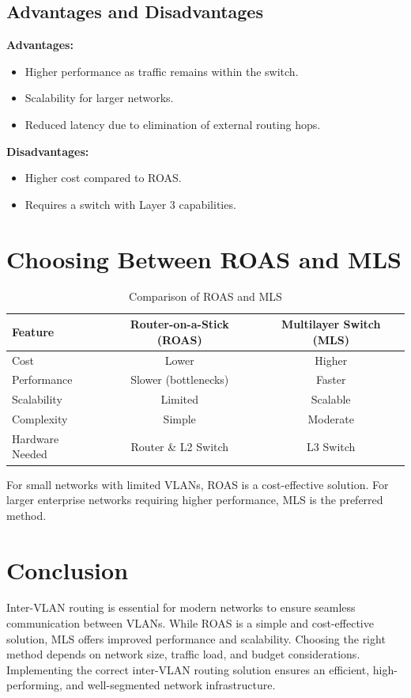 \documentclass[a4paper]{book}
\begin{document}
\subsection{Advantages and Disadvantages}
\textbf{Advantages:}
\begin{itemize}
    \item Higher performance as traffic remains within the switch.
    \item Scalability for larger networks.
    \item Reduced latency due to elimination of external routing hops.
\end{itemize}

\textbf{Disadvantages:}
\begin{itemize}
    \item Higher cost compared to ROAS.
    \item Requires a switch with Layer 3 capabilities.
\end{itemize}

\section{Choosing Between ROAS and MLS}
\begin{table}[h]
    \centering
    \begin{tabular}{lcc}
        \toprule
        Feature & Router-on-a-Stick (ROAS) & Multilayer Switch (MLS) \\
        \midrule
        Cost & Lower & Higher \\
        Performance & Slower (bottlenecks) & Faster \\
        Scalability & Limited & Scalable \\
        Complexity & Simple & Moderate \\
        Hardware Needed & Router \& L2 Switch & L3 Switch \\
        \bottomrule
    \end{tabular}
    \caption{Comparison of ROAS and MLS}
    \label{tab:comparison}
\end{table}

For small networks with limited VLANs, ROAS is a cost-effective solution. For larger enterprise networks requiring higher performance, MLS is the preferred method.

\section{Conclusion}
Inter-VLAN routing is essential for modern networks to ensure seamless communication between VLANs. While ROAS is a simple and cost-effective solution, MLS offers improved performance and scalability. Choosing the right method depends on network size, traffic load, and budget considerations. Implementing the correct inter-VLAN routing solution ensures an efficient, high-performing, and well-segmented network infrastructure.
\end{document}
